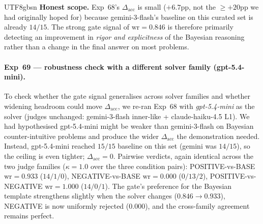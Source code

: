 \documentclass{article}
\begin{document}
\begin{CJK*}{UTF8}{gbsn}
\textbf{Honest scope.} Exp~68's \(\Delta_{\mathrm{acc}}\) is
small (\(+6.7\)pp, not the \(\geq +20\)pp we had originally
hoped for) because gemini-3-flash's baseline on this curated
set is already \(14/15\). The strong gate signal of
\(\mathrm{wr}=0.846\) is therefore primarily detecting an
improvement in \emph{rigor and explicitness} of the Bayesian
reasoning rather than a change in the final answer on most
problems.

\paragraph{Exp~69 --- robustness check with a different solver
family (gpt-5.4-mini).} To check whether the gate signal
generalises across solver families and whether widening headroom
could move \(\Delta_{\mathrm{acc}}\), we re-ran Exp~68 with
\emph{gpt-5.4-mini} as the solver (judges unchanged: gemini-3-flash
inner-like + claude-haiku-4.5 L1). We had hypothesised gpt-5.4-mini
might be weaker than gemini-3-flash on Bayesian counter-intuitive
problems and produce the wider \(\Delta_{\mathrm{acc}}\) the
demonstration needed. Instead, gpt-5.4-mini reached
\(15/15\) baseline on this set (gemini was \(14/15\)), so the
ceiling is even tighter; \(\Delta_{\mathrm{acc}} = 0\).
Pairwise verdicts, again identical across the two judge families
(\(\kappa = 1.0\) over the three condition pairs):
POSITIVE-vs-BASE \(\mathrm{wr} = \mathbf{0.933}\) (\(14/1/0\)),
NEGATIVE-vs-BASE \(\mathrm{wr} = 0.000\) (\(0/13/2\)),
POSITIVE-vs-NEGATIVE \(\mathrm{wr} = 1.000\) (\(14/0/1\)). The
gate's preference for the Bayesian template strengthens
slightly when the solver changes (\(0.846 \to 0.933\)),
NEGATIVE is now uniformly rejected (\(0.000\)), and the
cross-family agreement remains perfect.


\end{CJK*}
\end{document}
